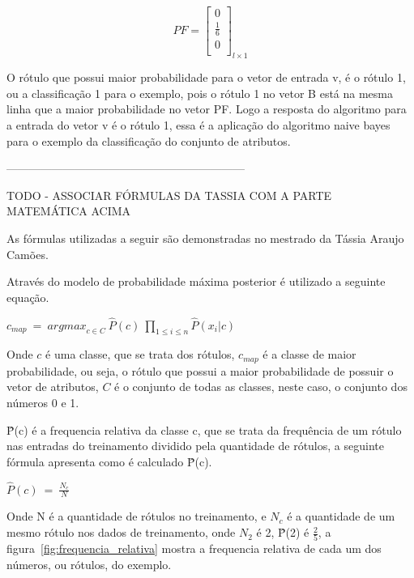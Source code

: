 $$PF=\left[
\begin{array}{c}
0 \\
\frac{1}{6} \\
0 \\
\end{array}
\right]_{l \times 1}
$$

O rótulo que possui maior probabilidade para o vetor de entrada v, é
o rótulo 1, ou a classificação 1 para o exemplo, pois o rótulo 1 no
vetor B está na mesma linha que a maior probabilidade no vetor PF.
Logo a resposta do algoritmo para a entrada do vetor v é o rótulo 1,
essa é a aplicação do algoritmo naive bayes para o exemplo da classificação
do conjunto de atributos.




---------------------------------------------------------------

TODO - ASSOCIAR FÓRMULAS DA TASSIA COM A PARTE MATEMÁTICA ACIMA

As fórmulas utilizadas a seguir são demonstradas no mestrado da Tássia Araujo Camões.

Através do modelo de probabilidade máxima posterior é utilizado a seguinte equação.

\begin{center}

$ c_{map} \ = \ {arg max}_{c \in C} \ \hat{P}(c) \ \prod\limits_{1 \leq i \leq n} \hat{P}(x_i | c)  $
\\
\end{center}

Onde $c$ é uma classe, que se trata dos rótulos, $c_{map}$ é a classe de maior
probabilidade, ou seja, o rótulo que possui a maior probabilidade de possuir o vetor
de atributos, $C$ é o conjunto de todas as classes, neste caso, o conjunto dos números
0 e 1.

{\^P}(c) é a frequencia relativa da classe c, que se trata da frequência de um rótulo
nas entradas do treinamento dividido pela quantidade de rótulos, a seguinte fórmula
apresenta como é calculado {\^P}(c).

\begin{center}

$ \hat{P}(c) \ = \ \frac{N_c}{N} $
\\
\end{center}

Onde N é a quantidade de rótulos no treinamento, e $N_c$ é a quantidade de um mesmo
rótulo nos dados de treinamento, onde $N_{2}$ é 2, {\^P}(2) é $\frac{2}{5}$, a
figura~\ref{fig:frequencia_relativa} mostra a frequencia relativa de  cada um dos
números, ou rótulos, do exemplo.

